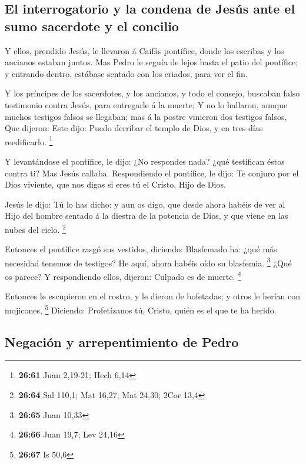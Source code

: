 \hypertarget{el-interrogatorio-y-la-condena-de-jesuxfas-ante-el-sumo-sacerdote-y-el-concilio}{%
\subsection{El interrogatorio y la condena de Jesús ante el sumo
sacerdote y el
concilio}\label{el-interrogatorio-y-la-condena-de-jesuxfas-ante-el-sumo-sacerdote-y-el-concilio}}

 Y ellos, prendido Jesús, le llevaron á Caifás pontífice,
donde los escribas y los ancianos estaban juntos.  Mas
Pedro le seguía de lejos hasta el patio del pontífice; y entrando
dentro, estábase sentado con los criados, para ver el fin.

 Y los príncipes de los sacerdotes, y los ancianos, y
todo el consejo, buscaban falso testimonio contra Jesús, para entregarle
á la muerte;  Y no lo hallaron, aunque muchos testigos
falsos se llegaban; mas á la postre vinieron dos testigos falsos,
 Que dijeron: Este dijo: Puedo derribar el templo de
Dios, y en tres días reedificarlo. \footnote{\textbf{26:61} Juan
  2,19-21; Hech 6,14}

 Y levantándose el pontífice, le dijo: ¿No respondes
nada? ¿qué testifican éstos contra ti?  Mas Jesús
callaba. Respondiendo el pontífice, le dijo: Te conjuro por el Dios
viviente, que nos digas si eres tú el Cristo, Hijo de Dios.

 Jesús le dijo: Tú lo has dicho: y aun os digo, que desde
ahora habéis de ver al Hijo del hombre sentado á la diestra de la
potencia de Dios, y que viene en las nubes del cielo. \footnote{\textbf{26:64}
  Sal 110,1; Mat 16,27; Mat 24,30; 2Cor 13,4}

 Entonces el pontífice rasgó sus vestidos, diciendo:
Blasfemado ha: ¿qué más necesidad tenemos de testigos? He aquí, ahora
habéis oído su blasfemia. \footnote{\textbf{26:65} Juan 10,33}
 ¿Qué os parece? Y respondiendo ellos, dijeron: Culpado
es de muerte. \footnote{\textbf{26:66} Juan 19,7; Lev 24,16}

 Entonces le escupieron en el rostro, y le dieron de
bofetadas; y otros le herían con mojicones, \footnote{\textbf{26:67} Is
  50,6}  Diciendo: Profetízanos tú, Cristo, quién es el
que te ha herido.

\hypertarget{negaciuxf3n-y-arrepentimiento-de-pedro}{%
\subsection{Negación y arrepentimiento de
Pedro}\label{negaciuxf3n-y-arrepentimiento-de-pedro}}

